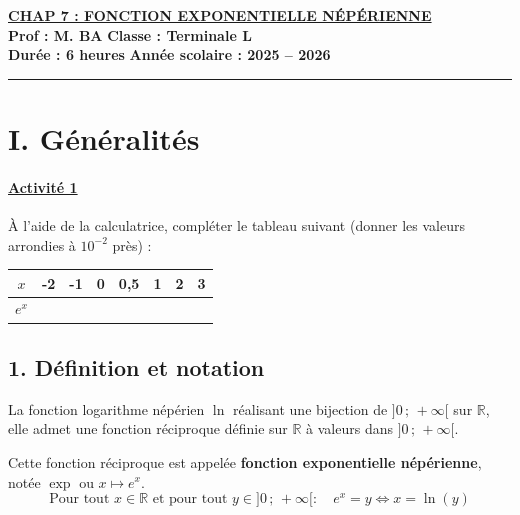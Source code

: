 \documentclass[12pt,a4paper]{article}
\begin{document}
\begin{center}
    \Large\textbf{\underline{\textcolor{myred}{CHAP 7 : FONCTION EXPONENTIELLE NÉPÉRIENNE}}}\\[0.2cm]
    \normalsize\textbf{Prof : M. BA} \hfill \textbf{Classe : Terminale L}\\[0.1cm]
    \textbf{Durée : 6 heures} \hfill \textbf{Année scolaire : 2025 -- 2026}
\end{center}
\hrule
\vspace{0.3cm}


\section*{\color{myred}I. Généralités}

\paragraph{\underline{Activité 1}}
À l'aide de la calculatrice, compléter le tableau suivant (donner les valeurs arrondies à $10^{-2}$ près) :

\begin{center}
\renewcommand{\arraystretch}{1.5}
\begin{tabular}{|c|c|c|c|c|c|c|c|}
\hline
$x$ & -2 & -1 & 0 & 0,5 & 1 & 2 & 3 \\
\hline
$e^x$ & \hspace*{0.8cm} & \hspace*{0.8cm} & \hspace*{0.8cm} & \hspace*{0.8cm} & \hspace*{0.8cm} & \hspace*{0.8cm} & \hspace*{0.8cm} \\
\hline
\end{tabular}
\end{center}

\vspace{0.3cm}

\subsection*{\color{myred}1. Définition et notation}
\begin{tcolorbox}[colback=blue!5!white,colframe=myblue,title=\textbf{Définition}]
La fonction logarithme népérien $\ln$ réalisant une bijection de $]0\,;\,+\infty[$ sur $\mathbb{R}$, elle admet une fonction réciproque définie sur $\mathbb{R}$ à valeurs dans $]0\,;\,+\infty[$. 

Cette fonction réciproque est appelée \textbf{fonction exponentielle népérienne}, notée $\exp$ ou $x \mapsto e^x$.
\[
\text{Pour tout } x \in \mathbb{R} \text{ et pour tout } y \in ]0\,;\,+\infty[ : \quad e^x = y \iff x = \ln(y)
\]
\end{tcolorbox}
\end{document}
